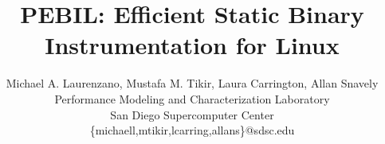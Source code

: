 \documentclass[a4paper,11pt,leqno,notitlepage,onecolumn]{article}
\begin{document}
\title{\bf{PEBIL: Efficient Static Binary Instrumentation for Linux}}
\author{
Michael A. Laurenzano, Mustafa M. Tikir, Laura Carrington, Allan Snavely\\
Performance Modeling and Characterization Laboratory\\
San Diego Supercomputer Center\\
\{michaell,mtikir,lcarring,allans\}@sdsc.edu\\
}
\date{}
\maketitle

\begin{abstract}

\end{abstract}















%



\end{document}
